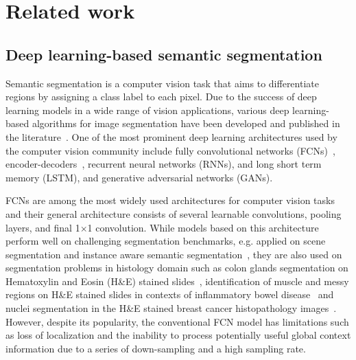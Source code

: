 \chapter{Related work}
\section{Deep learning-based semantic segmentation}
Semantic segmentation is a computer vision task that aims to differentiate regions by assigning a class label to each pixel. Due to the success of deep learning models in a wide range of vision applications, various deep learning-based algorithms for image segmentation have been developed and published in the literature~\cite{haralick1983image}. One of the most prominent deep learning architectures used by the computer vision community include fully convolutional networks (FCNs)~\cite{long2015fully}, encoder-decoders~\cite{noh2015learning}, recurrent neural networks (RNNs), and long short term memory (LSTM), and generative adversarial networks (GANs).

FCNs are among the most widely used architectures for computer vision tasks and their general architecture consists of several learnable convolutions, pooling layers, and final 1$\times$1 convolution. While models based on this architecture perform well on challenging segmentation benchmarks, e.g. applied on scene segmentation \cite{yu2020context} and instance aware semantic segmentation~\cite{li2017fully}, they are also used on segmentation problems in histology domain such as colon glands segmentation on Hematoxylin and Eosin (H\&E) stained slides~\cite{bentaieb2016topology}, identification of muscle and messy regions on H\&E stained slides in contexts of inflammatory bowel disease~\cite{wang2016deep} and nuclei segmentation in the H\&E stained breast cancer histopathology images~\cite{natarajan2020segmentation}. However, despite its popularity, the conventional FCN model has limitations such as loss of localization and the inability to process potentially useful global context information due to a series of down-sampling and a high sampling rate.

